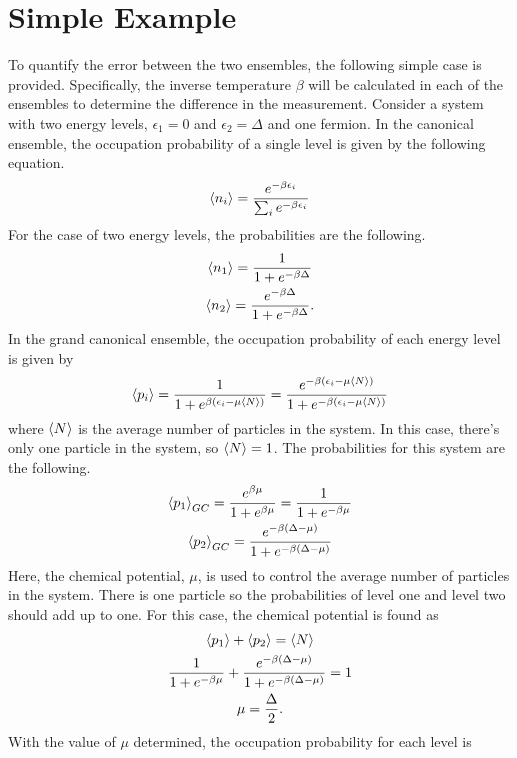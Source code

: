 \section{Simple Example}
To quantify the error between the two ensembles, the following simple case is provided. Specifically, the inverse temperature $\beta$ will be calculated in each of the ensembles to determine the difference in the measurement. Consider a system with two energy levels, $\epsilon_1=0$ and $\epsilon_2=\Delta$ and one fermion. In the canonical ensemble, the occupation probability of a single level is given by the following equation.
\begin{equation}
    \left<{n_i}\right>=\frac{e^{-\beta\epsilon_i}}{\sum_i e^{-\beta\epsilon_i}}
\end{equation}
For the case of two energy levels, the probabilities are the following.
\begin{gather}
    \left<{n_1}\right>=\frac{1}{1+e^{-\beta\Delta}}\\
    \left<{n_2}\right>=\frac{e^{-\beta\Delta}}{1+e^{-\beta\Delta}}.
\end{gather}
In the grand canonical ensemble, the occupation probability of each energy level is given by 
\begin{equation}
    \left<{p_i}\right>=\frac{1}{1+e^{\beta(\epsilon_i-\mu \left<{N}\right>)}}=\frac{e^{-\beta(\epsilon_i-\mu \left<{N}\right>)}}{1+e^{-\beta(\epsilon_i-\mu \left<{N}\right>)}}
\end{equation}
where $\left<{N}\right>$ is the average number of particles in the system. In this case, there's only one particle in the system, so $\left<{N}\right>=1$. The probabilities for this system are the following.
\begin{gather}
    \left<{p_1}\right>_{GC}=\frac{e^{\beta\mu}}{1+e^{\beta\mu}}=\frac{1}{1+e^{-\beta\mu}}\\
    \left<{p_2}\right>_{GC}=\frac{e^{-\beta(\Delta-\mu)}}{1+ e^{-\beta(\Delta-\mu)}}
\end{gather}
Here, the chemical potential, $\mu$, is used to control the average number of particles in the system. There is one particle so the probabilities of level one and level two should add up to one. For this case, the chemical potential is found as 
\begin{gather}
    \left<{p_1}\right>+\left<{p_2}\right>=\left<{N}\right>\nonumber\\
    \frac{1}{1+e^{-\beta\mu}}+\frac{e^{-\beta(\Delta-\mu)}}{1+e^{-\beta(\Delta-\mu)}}=1\nonumber\\
    \mu=\frac{\Delta}{2}.
\end{gather}
With the value of $\mu$ determined, the occupation probability for each level is
